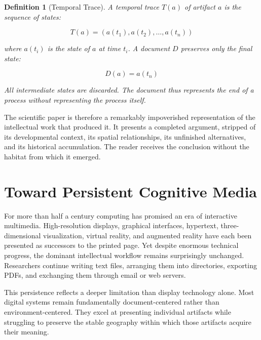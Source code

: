 \documentclass[12pt,oneside]{article}
\newtheorem{definition}{Definition}[section]
\theoremstyle{remark}
\begin{document}
\begin{definition}[Temporal Trace]
A temporal trace $T(a)$ of artifact $a$ is the sequence of states:

\begin{equation}
T(a) = (a(t_1), a(t_2), \ldots, a(t_n))
\end{equation}

where $a(t_i)$ is the state of $a$ at time $t_i$. A document $D$ preserves only the final state:

\begin{equation}
D(a) = a(t_n)
\end{equation}

All intermediate states are discarded. The document thus represents the end of a process without representing the process itself.
\end{definition}

The scientific paper is therefore a remarkably impoverished representation of the intellectual work that produced it. It presents a completed argument, stripped of its developmental context, its spatial relationships, its unfinished alternatives, and its historical accumulation. The reader receives the conclusion without the habitat from which it emerged.


\section{Toward Persistent Cognitive Media}

For more than half a century computing has promised an era of interactive multimedia. High-resolution displays, graphical interfaces, hypertext, three-dimensional visualization, virtual reality, and augmented reality have each been presented as successors to the printed page. Yet despite enormous technical progress, the dominant intellectual workflow remains surprisingly unchanged. Researchers continue writing text files, arranging them into directories, exporting PDFs, and exchanging them through email or web servers.

This persistence reflects a deeper limitation than display technology alone. Most digital systems remain fundamentally document-centered rather than environment-centered. They excel at presenting individual artifacts while struggling to preserve the stable geography within which those artifacts acquire their meaning.
\end{document}
